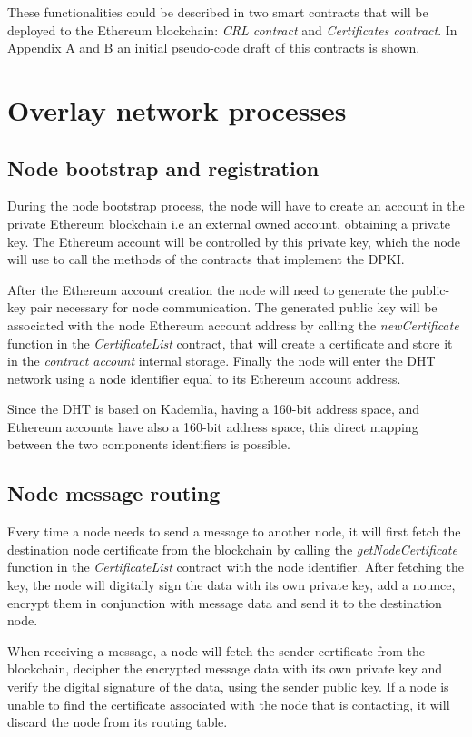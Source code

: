 These functionalities could be described in two smart contracts that will be deployed to the Ethereum blockchain: \textit{CRL contract} and \textit{Certificates contract}.
In Appendix A and B an initial pseudo-code draft of this contracts is shown.

\section{Overlay network processes}

\subsection{Node bootstrap and registration}
During the node bootstrap process, the node will have to create an account in the private Ethereum blockchain i.e an external owned account, obtaining a private key.
The Ethereum account will be controlled by this private key, which the node will use to call the methods of the contracts that implement the DPKI.

After the Ethereum account creation the node will need to generate the public-key pair necessary for node communication.
The generated public key will be associated with the node Ethereum account address by calling the \textit{newCertificate} function in the \textit{CertificateList} contract, that will create a certificate and store it in the \textit{contract account} internal storage.
Finally the node will enter the DHT network using a node identifier equal to its Ethereum account address.

Since the DHT is based on Kademlia, having a 160-bit address space, and Ethereum accounts have also a 160-bit address space, this direct mapping between the two components identifiers is possible.

\subsection{Node message routing}
Every time a node needs to send a message to another node, it will first fetch the destination node certificate from the blockchain by calling the \textit{getNodeCertificate} function in the \textit{CertificateList} contract with the node identifier.
After fetching the key, the node will digitally sign the data with its own private key, add a nounce, encrypt them in conjunction with message data and send it to the destination node.

When receiving a message, a node will fetch the sender certificate from the blockchain, decipher the encrypted message data with its own private key and verify the digital signature of the data, using the sender public key.
If a node is unable to find the certificate associated with the node that is contacting, it will discard the node from its routing table.


